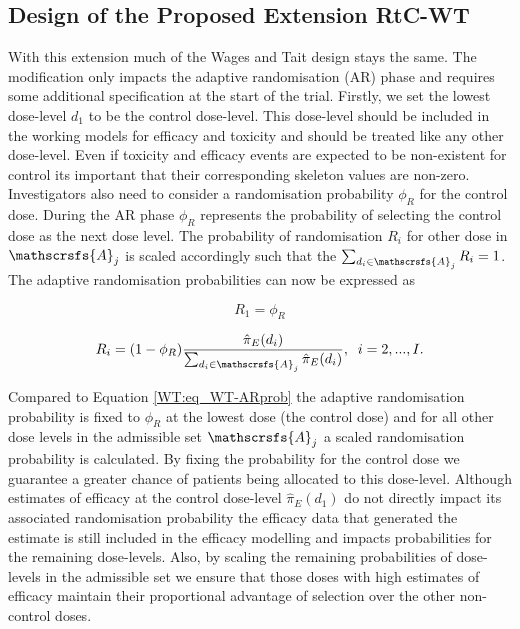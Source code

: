 \subsection{Design of the Proposed Extension RtC-WT}
\label{WT:Design-RtC-WT}

With this extension much of the Wages and Tait design stays the same. The modification only impacts the adaptive randomisation (AR) phase and requires some additional specification at the start of the trial. Firstly, we set the lowest dose-level $d_1$ to be the control dose-level. This dose-level should be included in the working models for efficacy and toxicity and should be treated like any other dose-level. Even if toxicity and efficacy events are expected to be non-existent for control its important that their corresponding skeleton values are non-zero. Investigators also need to consider a randomisation probability $\phi_R$ for the control dose. During the AR phase $\phi_R$ represents the probability of selecting the control dose as the next dose level. The probability of randomisation $R_i$ for other dose in $\mathscrsfs{A}_j$ is scaled accordingly such that the $\sum_{d_i \in \mathscrsfs{A}_j} R_i = 1$. The adaptive randomisation probabilities can now be expressed as 

\begin{equation}
R_1 = \phi_R
\end{equation}

\begin{equation}
R_i = (1-\phi_R)\frac{\hat{\pi}_E(d_i)}{\sum_{d_i \in \mathscrsfs{A}_j}\hat{\pi}_E(d_i)}, \; \; i=2,...,I. 
\end{equation}

Compared to Equation \ref{WT:eq_WT-ARprob} the adaptive randomisation probability is fixed to $\phi_R$ at the lowest dose (the control dose) and for all other dose levels in the admissible set $\mathscrsfs{A}_j$ a scaled randomisation probability is calculated. By fixing the probability for the control dose we guarantee a greater chance of patients being allocated to this dose-level. Although estimates of efficacy at the control dose-level $\hat{\pi}_E(d_1)$ do not directly impact its associated randomisation probability the efficacy data that generated the estimate is still included in the efficacy modelling and impacts probabilities for the remaining dose-levels. Also, by scaling the remaining probabilities of dose-levels in the admissible set we ensure that those doses with high estimates of efficacy maintain their proportional advantage of selection over the other non-control doses.

